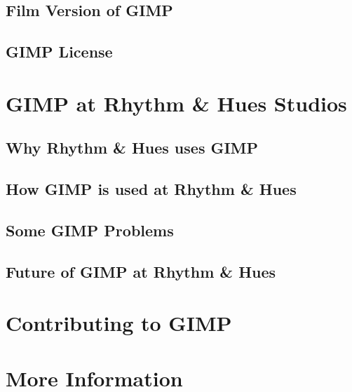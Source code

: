 \documentclass{report}
\begin{document}
\section{Film Version of GIMP} 
\label{sec:Film_Version_of_GIMP}


\section{GIMP License}
\label{sec:GIMP_License}



\chapter{GIMP at Rhythm \& Hues Studios}
\label{ch:GIMP_at_Rhythm_Hues}


\section{Why Rhythm \& Hues uses GIMP}
\label{sec:Why_Rhythm_Hues_uses_GIMP}


\section{How GIMP is used at Rhythm \& Hues}
\label{sec:How_GIMP_is_used_at_Rhythm_Hues}


\section{Some GIMP Problems}
\label{sec:Some_GIMP_Problems}


\section{Future of GIMP at Rhythm \& Hues} 
\label{sec:Future_of_GIMP_at_Rhythm_Hues}



\chapter{Contributing to GIMP}
\label{ch:Contributing_to_GIMP}



\chapter{More Information}
\label{ch:More_Information}


{
\small


}
\end{document}
